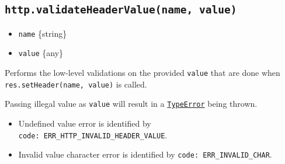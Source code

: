 \begin{Shaded}
\begin{Highlighting}[]
\OperatorTok{=} \NormalTok{(}\NormalTok{)}\OperatorTok{;}

\NormalTok{ \{}
  \NormalTok{(}\StringTok{\textquotesingle{}\textquotesingle{}}\NormalTok{)}\OperatorTok{;}
\NormalTok{\} }
   \NormalTok{)}\OperatorTok{;} 
  \NormalTok{)}\OperatorTok{;} 
  \NormalTok{)}\OperatorTok{;} 
\NormalTok{\}}
\end{Highlighting}
\end{Shaded}

\subsection{\texorpdfstring{\texttt{http.validateHeaderValue(name,\ value)}}{http.validateHeaderValue(name, value)}}\label{http.validateheadervaluename-value}

\begin{itemize}
\tightlist
\item
  \texttt{name} \{string\}
\item
  \texttt{value} \{any\}
\end{itemize}

Performs the low-level validations on the provided \texttt{value} that
are done when \texttt{res.setHeader(name,\ value)} is called.

Passing illegal value as \texttt{value} will result in a
\href{errors.md\#class-typeerror}{\texttt{TypeError}} being thrown.

\begin{itemize}
\tightlist
\item
  Undefined value error is identified by
  \texttt{code:\ \textquotesingle{}ERR\_HTTP\_INVALID\_HEADER\_VALUE\textquotesingle{}}.
\item
  Invalid value character error is identified by
  \texttt{code:\ \textquotesingle{}ERR\_INVALID\_CHAR\textquotesingle{}}.
\end{itemize}

